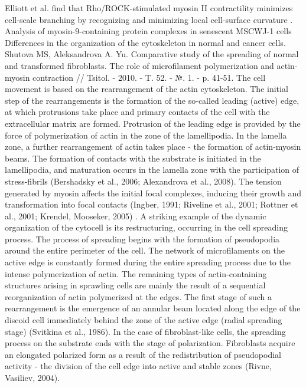 \documentclass[english,authoryear]{elsarticle}
\begin{document}
Elliott et al. find that Rho/ROCK-stimulated myosin II contractility minimizes cell-scale branching by recognizing and minimizing local cell-surface curvature \cite{elliott2015myosin}.
Analysis of myosin-9-containing protein complexes in senescent MSCWJ-1 cells
Differences in the organization of the cytoskeleton in normal and cancer cells. Shutova MS, Aleksandrova A. Yu. Comparative study of the spreading of normal and transformed fibroblasts. The role of microfilament polymerization and actin-myosin contraction // Tsitol. - 2010. - T. 52. - №. 1. - p. 41-51.
The cell movement is based on the rearrangement of the actin cytoskeleton. The initial step of the rearrangements is the formation of the so-called leading (active) edge, at which protrusions take place and primary contacts of the cell with the extracellular matrix are formed. Protrusion of the leading edge is provided by the force of polymerization of actin in the zone of the lamellipodia. In the lamella zone, a further rearrangement of actin takes place - the formation of actin-myosin beams. The formation of contacts with the substrate is initiated in the lamellipodia, and maturation occurs in the lamella zone with the participation of stress-fibrils (Bershadsky et al., 2006; Alexandrova et al., 2008). The tension generated by myosin affects the initial focal complexes, inducing their growth and transformation into focal contacts (Ingber, 1991; Riveline et al., 2001; Rottner et al., 2001; Krendel, Mooseker, 2005) .
A striking example of the dynamic organization of the cytocell is its restructuring, occurring in the cell spreading process. The process of spreading begins with the formation of pseudopodia around the entire perimeter of the cell. The network of microfilaments on the active edge is constantly formed during the entire spreading process due to the intense polymerization of actin. The remaining types of actin-containing structures arising in sprawling cells are mainly the result of a sequential reorganization of actin polymerized at the edges. The first stage of such a rearrangement is the emergence of an annular beam located along the edge of the discoid cell immediately behind the zone of the active edge (radial spreading stage) (Svitkina et al., 1986). In the case of fibroblast-like cells, the spreading process on the substrate ends with the stage of polarization. Fibroblasts acquire an elongated polarized form as a result of the redistribution of pseudopodial activity - the division of the cell edge into active and stable zones (Rivne, Vasiliev, 2004).
\end{document}
